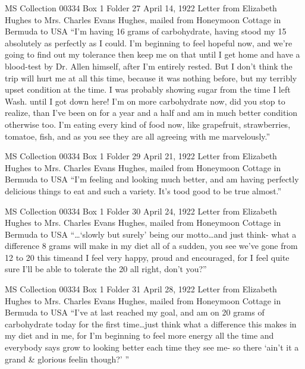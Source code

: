 \documentclass[12pt]{article}
\begin{document}
MS Collection 00334
Box 1 Folder 27
April 14, 1922
Letter from Elizabeth Hughes to Mrs. Charles Evans Hughes, mailed from Honeymoon Cottage in Bermuda to USA
``I'm having 16 grams of carbohydrate, having stood my 15 absolutely as perfectly as I could. I'm beginning to feel hopeful now, and we're going to find out my tolerance then keep me on that until I get home and have a blood-test by Dr. Allen himself, after I'm entirely rested. But I don't think the trip will hurt me at all this time, because it was nothing before, but my terribly upset condition at the time. I was probably showing sugar from the time I left Wash. until I got down here! I'm on more carbohydrate now, did you stop to realize, than I've been on for a year and a half and am in much better condition otherwise too. I'm eating every kind of food now, like grapefruit, strawberries, tomatoe, fish, and as you see they are all agreeing with me marvelously.'' 

MS Collection 00334
Box 1 Folder 29
April 21, 1922
Letter from Elizabeth Hughes to Mrs. Charles Evans Hughes, mailed from Honeymoon Cottage in Bermuda to USA
``I'm feeling and looking much better, and am having perfectly delicious things to eat and such a variety. It's tood good to be true almost.''

MS Collection 00334
Box 1 Folder 30
April 24, 1922
Letter from Elizabeth Hughes to Mrs. Charles Evans Hughes, mailed from Honeymoon Cottage in Bermuda to USA
``\dots `slowly but surely' being our motto\dots and just think- what a difference 8 grams will make in my diet all of a sudden, you see we've gone from 12 to 20 this timeand I feel very happy, proud and encouraged, for I feel quite sure I'll be able to tolerate the 20 all right, don't you?''

MS Collection 00334
Box 1 Folder 31
April 28, 1922
Letter from Elizabeth Hughes to Mrs. Charles Evans Hughes, mailed from Honeymoon Cottage in Bermuda to USA
``I've at last reached my goal, and am on 20 grams of carbohydrate today for the first time\dots just think what a difference this makes in my diet and in me, for I'm beginning to feel more energy all the time and everybody says grow to looking better each time they see me- so there `ain't it a grand \& glorious feelin though?' ''
\end{document}
